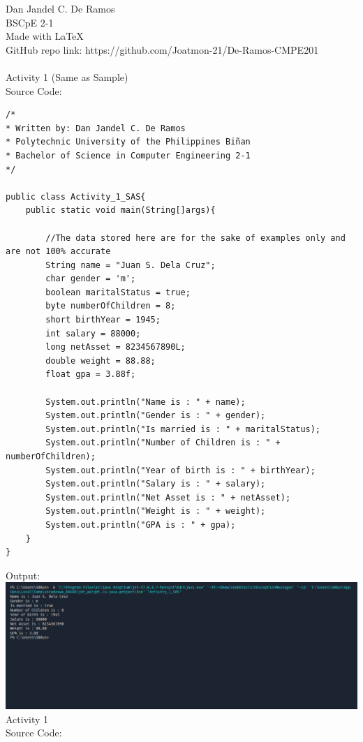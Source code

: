 \documentclass[12pt]{article}
\begin{document}
 
	\noindent
	Dan Jandel C. De Ramos\\
	BSCpE 2-1\\
	Made with \LaTeX \\
	GitHub repo link: https://github.com/Joatmon-21/De-Ramos-CMPE201\\
	\\
	Activity 1 (Same as Sample)\\
	Source Code:
	\begin{verbatim}         
/*
* Written by: Dan Jandel C. De Ramos
* Polytechnic University of the Philippines Biñan
* Bachelor of Science in Computer Engineering 2-1
*/
		
public class Activity_1_SAS{
	public static void main(String[]args){         
				
		//The data stored here are for the sake of examples only and are not 100% accurate        
		String name = "Juan S. Dela Cruz";        
		char gender = 'm';        
		boolean maritalStatus = true;
		byte numberOfChildren = 8;
		short birthYear = 1945;
		int salary = 88000;  
		long netAsset = 8234567890L;
		double weight = 88.88;
		float gpa = 3.88f;
				
		System.out.println("Name is : " + name);
		System.out.println("Gender is : " + gender);
		System.out.println("Is married is : " + maritalStatus);
		System.out.println("Number of Children is : " + numberOfChildren);
		System.out.println("Year of birth is : " + birthYear);
		System.out.println("Salary is : " + salary);
		System.out.println("Net Asset is : " + netAsset);
		System.out.println("Weight is : " + weight);
		System.out.println("GPA is : " + gpa);       
	}
}
	\end{verbatim}
	\clearpage
	\noindent
	Output:\\
	\includegraphics[width=\textwidth]{output1SAS}
	\clearpage
	\noindent
	Activity 1\\
	Source Code:
\end{document}
